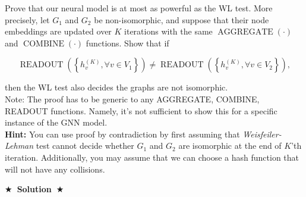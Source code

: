 \documentclass{article}
\numberwithin{figure}{section}
\newcommand{\Solution}[1]{%
    {%
        \medskip
        \color{red}
        \bf $\bigstar$~\sf\textbf{Solution}~$\bigstar$ \sf
        #1
    }
    \bigskip
}
\begin{document}
    Prove that our neural model is at most as powerful as the WL test. More precisely, let $G_1$ and $G_2$ be non-isomorphic, and suppose that their node embeddings are updated over $K$ iterations with the same $\operatorname{AGGREGATE}(\cdot)$ and $\operatorname{COMBINE}(\cdot)$ functions. Show that if

    $$\operatorname { READOUT }\left(\left\{h_v^{(K)}, \forall v \in V_1\right\}\right) \neq \operatorname { READOUT }\left(\left\{h_v^{(K)}, \forall v \in V_2\right\}\right),$$

then the WL test also decides the graphs are not isomorphic.\\

Note: The proof has to be generic to any AGGREGATE, COMBINE, READOUT functions. Namely, it's not sufficient to show this for a specific instance of the GNN model.\\

\textbf{Hint:} You can use proof by contradiction by first assuming that \textit{Weisfeiler-Lehman} test cannot decide whether $G_1$ and $G_2$ are isomorphic at the end of $K$’th iteration. Additionally, you may assume that we can choose a hash function that will not have any collisions.

\Solution{}
\end{document}
